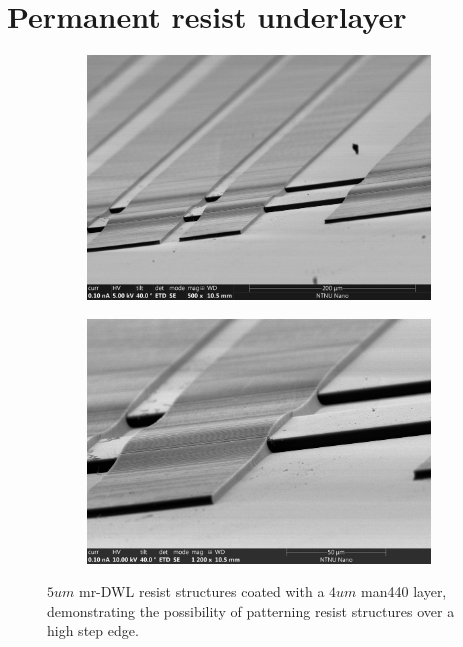 \chapter{Permanent resist underlayer}

\begin{figure}
\centering
\begin{subfigure}{.5\textwidth}
  \centering
  \includegraphics[width=\linewidth]{fig/mr-DWL/sem_mr-dwl-2.jpg}
  \label{fig:sfig1}
\end{subfigure}%

\begin{subfigure}{.5\textwidth}
  \centering
  \includegraphics[width=\linewidth]{fig/mr-DWL/sem_mr-dwl.jpg}
  \label{fig:sfig2}
\end{subfigure}
\caption{$5um$ mr-DWL resist structures coated with a $4um$ man440 layer, demonstrating the possibility of patterning resist structures over a high step edge. }
\label{fig:fig}
\end{figure}

